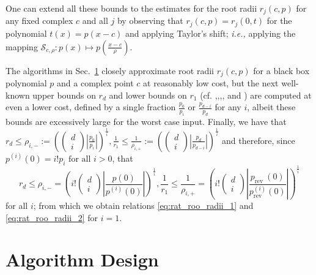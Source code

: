 \documentclass[runningheads]{llncs}
\begin{document}

One can extend all these bounds to the estimates for the root radii $r_{j}(c, p)$ for any fixed complex $c$ and all $j$ by observing that $r_{j}(c, p)=r_{j}(0, t)$ for the polynomial $t(x)=p(x-c)$ and applying Taylor's shift; \emph{i.e.,} applying the mapping $\mathcal{S}_{c ,\rho }:p(x) \mapsto p\left( \frac{x - c}{\rho} \right)$.

The algorithms in Sec.~\ref{sec:alg_des} closely approximate root radii $r_{j}(c, p)$ for a black box polynomial $p$ and a complex point $c$ at reasonably low cost, but the next well-known upper bounds on $r_{d}$ and lower bounds on $r_{1}$ (cf. \cite{kerimov1977applied},\cite{carstensen1991inclusion},\cite{pan2000approximating},\cite{bini2000design}, and \cite{bini2014solving}) are computed at even a lower cost, defined by a single fraction $\frac{p_{0}}{p_{i}}$ or $\frac{p_{d-i}}{p_{d}}$ for any $i$, albeit these bounds are excessively large for the worst case input.
Finally, we have that
$r_{d} \leq \rho_{i,-}:=\left(\left(\begin{array}{c}d \\ i\end{array}\right)\left|\frac{p_{0}}{p_{i}}\right|\right)^{\frac{1}{i}}, \frac{1}{r_{1}} \leq \frac{1}{\rho_{i,+}}:=\left(\left(\begin{array}{l}d \\ i\end{array}\right)\left|\frac{p_{d}}{p_{d-i}}\right|\right)^{\frac{1}{i}}$
and therefore, since $p^{(i)}(0)=i ! p_{i} \text { for all } i>0$, that
\begin{equation}\label{eq:last_appen}
r_{d} \leq \rho_{i,-}=\left(i !\left(\begin{array}{c}
d \\
i
\end{array}\right)\left|\frac{p(0)}{p^{(i)}(0)}\right|\right)^{\frac{1}{i}}, \frac{1}{r_{1}} \leq \frac{1}{\rho_{i,+}}=\left(i !\left(\begin{array}{c}
d \\
i
\end{array}\right)\left|\frac{p_{\text {rev }}(0)}{p_{\text {rev }}^{(i)}(0)}\right|\right)^{\frac{1}{i}}
\end{equation}
for all $i$; from which we obtain relations \ref{eq:rat_roo_radii_1} and \ref{eq:rat_roo_radii_2} for $i=1$.




\section{Algorithm Design}\label{sec:alg_des}
\end{document}
